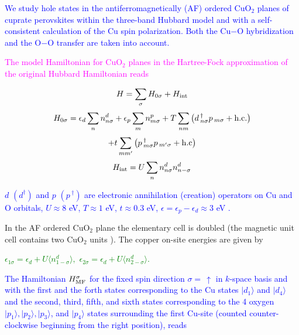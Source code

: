 \documentclass{article}
\begin{document}
\begin{Huge}
\noindent
{\bf{
\textcolor{blue}
{We study hole states in the antiferromagnetically (AF) ordered CuO$_2$
planes of cuprate perovskites within the three-band
Hubbard model and with a self-consistent calculation of the Cu spin
polarization.
Both the Cu$-$O hybridization and the
O$-$O transfer are taken into account.
}


\vspace{10mm}

\noindent
\textcolor{magenta}{
The model Hamiltonian for CuO$_2$ planes in the
Hartree-Fock approximation of the original
Hubbard Hamiltonian reads
\textcolor{red}{\cite{oles,siebold}} }


$$ H=\sum_{\sigma}H_{0\sigma}+H_{\rm int} $$
\[ H_{0\sigma}=\epsilon_d \sum_n n_{n\sigma}^d
          + \epsilon_p \sum_m n_{m\sigma}^p
       +T \sum_{nm} \left (d\,_{n\sigma}^\dagger p\,_{m\sigma}
                  + {\rm h.c.} \right ) \]
$$
  +t \sum_{mm'} \left (p\,_{m\sigma} ^\dagger p\,_{m'\sigma}
                  + {\rm h.c} \right )
$$
\[ H_{\rm int} = U\sum_n n_{n\sigma}^d n_{n-\sigma}^d \]

\noindent
\textcolor{blue}
{$d$ $(d^\dagger)$ and $p$ $(p \, ^\dagger)$ are electronic annihilation
(creation) operators on Cu and O orbitals,
$U \approx 8$ eV, $T \approx 1$ eV, $t \approx 0.3$ eV,
$\epsilon = \epsilon_p - \epsilon_d \approx 3$ eV}
\textcolor{red}{\cite{schluter,stechel}}\textcolor{blue}{.}

\vspace{10mm}
\noindent
In the AF ordered CuO$_2$ plane
the elementary cell is doubled
(the magnetic unit cell contains two CuO$_2$ units ).
The copper on-site energies are given by

\vspace{2mm}

\noindent
\textcolor{green}{
$\epsilon_{1 \sigma}=\epsilon_d + U \langle n_{1-\sigma}^d \rangle,$
$\epsilon_{2 \sigma}=\epsilon_d + U \langle n_{2-\sigma}^d \rangle.$ }

\vspace{10mm}
\noindent
\textcolor{blue}{
The Hamiltonian $ H_{\rm MF}^\sigma $ for the fixed
spin direction $\sigma = \,\uparrow $ in $k$-space  basis and
with the first and the forth states corresponding to the Cu states
$\vert d_1 \rangle $ and $\vert d_4 \rangle $
and the second, third, fifth, and sixth states corresponding to
the 4 oxygen $\vert p_1 \rangle , \vert p_2 \rangle , \vert p_3
\rangle $, and $ \vert p_4 \rangle$
states surrounding the first Cu-site (counted counter-clockwise
beginning from the right position), reads }


}}
\end{Huge}
\end{document}

